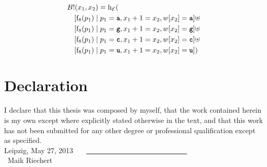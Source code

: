\documentclass[
    a4paper,
    12pt,
    twoside,
    BCOR=12mm,
    parskip=half,
    chapterprefix,
    numbers=noenddot,
    bibliography=totoc
]{scrbook}
\begin{document}
\begin{align*}
  &B!(x_1,x_2) = \op{h}_\mathcal{E}( \\
  &\quad [ \op{f}_8(p_1) \mid p_1 = \ts{a}, x_1 + 1 = x_2, w[x_2]=\ts{a} ] \uplus\\
  &\quad [ \op{f}_8(p_1) \mid p_1 = \ts{g}, x_1 + 1 = x_2, w[x_2]=\ts{g} ] \uplus\\
  &\quad [ \op{f}_8(p_1) \mid p_1 = \ts{c}, x_1 + 1 = x_2, w[x_2]=\ts{c} ] \uplus\\
  &\quad [ \op{f}_8(p_1) \mid p_1 = \ts{u}, x_1 + 1 = x_2, w[x_2]=\ts{u} ])
\end{align*}



\begingroup
	\sloppy
	\printbibliography
\endgroup

\cleardoublepage
\printglossaries

\cleardoublepage
\thispagestyle{empty} 
\section*{Declaration}

I declare that this thesis was composed by myself, that the work contained herein is my own
except where explicitly stated otherwise in the text, and that this work has not been submitted
for any other degree or professional qualification except as specified.
\vspace{3em}
\\
Leipzig, May 27, 2013 \ \ \ \underline{\ \ \ \ \ \ \ \ \ \ \ \ \ \ \ \ \ \ \ \ \ \ \ \ \ \ \ \ }\\
\hspace*{12em}\small{\ Maik Riechert}
\end{document}
